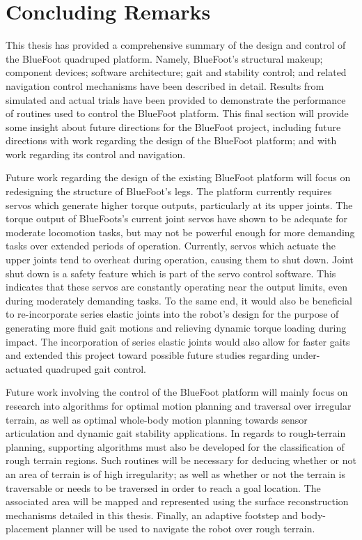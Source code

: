 \chapter{Concluding Remarks}


	This thesis has provided a comprehensive summary of the design and control of the BlueFoot quadruped platform. Namely, BlueFoot's structural makeup; component devices; software architecture; gait and stability control; and related navigation control mechanisms have been described in detail. Results from simulated and actual trials have been provided to demonstrate the performance of routines used to control the BlueFoot platform. This final section will provide some insight about future directions for the BlueFoot project, including future directions with work regarding the design of the BlueFoot platform; and with work regarding its control and navigation.


	Future work regarding the design of the existing BlueFoot platform will focus on redesigning the structure of BlueFoot's legs. The platform currently requires servos which generate higher torque outputs, particularly at its upper joints. The torque output of BlueFoots's current joint servos have shown to be adequate for moderate locomotion tasks, but may not be powerful enough for more demanding tasks over extended periods of operation. Currently, servos which actuate the upper joints tend to overheat during operation, causing them to shut down. Joint shut down is a safety feature which is part of the servo control software. This indicates that these servos are constantly operating near the output limits, even during moderately demanding tasks. To the same end, it would also be beneficial to re-incorporate series elastic joints into the robot's design for the purpose of generating more fluid gait motions and relieving dynamic torque loading during impact. The incorporation of series elastic joints would also allow for faster gaits and extended this project toward possible future studies regarding under-actuated quadruped gait control.


	Future work involving the control of the BlueFoot platform will mainly focus on research into algorithms for optimal motion planning and traversal over irregular terrain, as well as optimal whole-body motion planning towards sensor articulation and dynamic gait stability applications. In regards to rough-terrain planning, supporting algorithms must also be developed for the classification of rough terrain regions. Such routines will be necessary for deducing whether or not an area of terrain is of high irregularity; as well as whether or not the terrain is traversable or needs to be traversed in order to reach a goal location. The associated area will be mapped and represented using the surface reconstruction mechanisms detailed in this thesis. Finally, an adaptive footstep and body-placement planner will be used to navigate the robot over rough terrain. 


